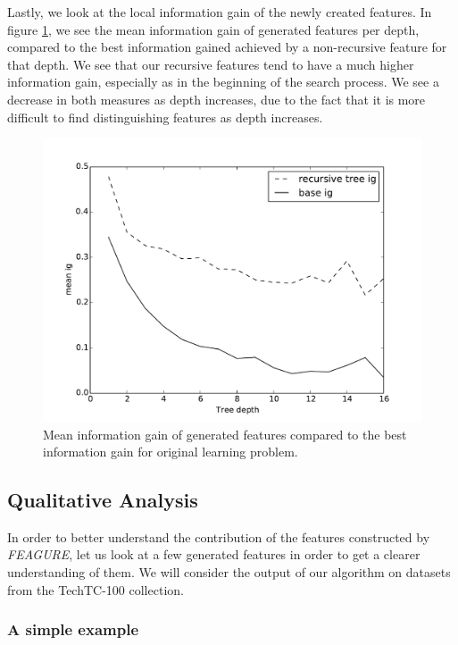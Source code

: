 \documentclass[twoside,11pt]{article}
\theoremstyle{definition}
\begin{document}
Lastly, we look at the local information gain of the newly created features. In figure \ref{fig:local_ig_depth}, we see the mean information gain of generated features per depth, compared to the best information gained achieved by a non-recursive feature for that depth. We see that our recursive features tend to have a much higher information gain, especially as in the beginning of the search process. We see a decrease in both measures as depth increases, due to the fact that it is more difficult to find distinguishing features as depth increases.

\begin{figure}[h!]
	\centering
	\includegraphics[scale=0.4]{local_ig_depth}
	\caption{Mean information gain of generated features compared to the best information gain for original learning problem.}
	\label{fig:local_ig_depth}
\end{figure}

\subsection{Qualitative Analysis}

In order to better understand the contribution of the features constructed by \emph{FEAGURE}, let us look at a few generated features in order to get a clearer understanding of them. We will consider the output of our algorithm on datasets from the TechTC-100 collection.

\subsubsection{A simple example}
\end{document}
